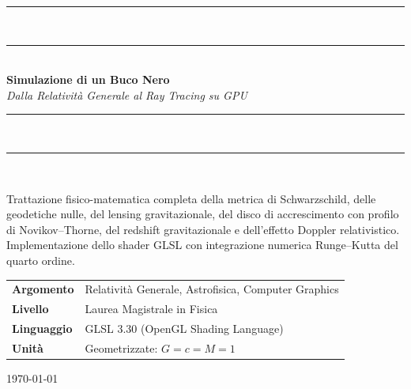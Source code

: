 \documentclass[12pt, a4paper, twoside]{article}
\theoremstyle{definition}
\begin{document}
\begin{titlepage}
  \centering
  \vspace*{2cm}

  {\color{NavyBlue}\rule{\linewidth}{1.5pt}}\\[0.5em]
  {\color{NavyBlue}\rule{\linewidth}{0.4pt}}\\[2em]

  {\Huge\bfseries\color{NavyBlue} Simulazione di un Buco Nero}\\[0.8em]
  {\large\itshape\color{DarkGray}
    Dalla Relativit\`a Generale al Ray Tracing su GPU}\\[2em]

  {\color{NavyBlue}\rule{\linewidth}{0.4pt}}\\[0.5em]
  {\color{NavyBlue}\rule{\linewidth}{1.5pt}}\\[3em]

  \begin{minipage}{0.85\textwidth}
    \centering
    {\normalsize\color{DarkGray}
      Trattazione fisico-matematica completa della metrica di Schwarzschild,
      delle geodetiche nulle, del lensing gravitazionale, del disco di
      accrescimento con profilo di Novikov--Thorne, del redshift gravitazionale
      e dell'effetto Doppler relativistico. Implementazione dello shader GLSL
      con integrazione numerica Runge--Kutta del quarto ordine.
    }
  \end{minipage}

  \vfill

  \begin{tabular}{ll}
    \toprule
    \textbf{Argomento}   & Relativit\`a Generale, Astrofisica, Computer Graphics \\
    \textbf{Livello}     & Laurea Magistrale in Fisica \\
    \textbf{Linguaggio}  & GLSL 3.30 (OpenGL Shading Language) \\
    \textbf{Unità}       & Geometrizzate: $G = c = M = 1$ \\
    \bottomrule
  \end{tabular}

  \vspace{2em}
  {\small\color{DarkGray}\today}
\end{titlepage}

\tableofcontents
\newpage
\end{document}
